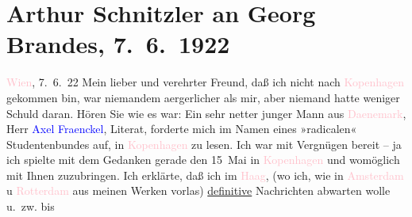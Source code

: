 

               \section[Arthur Schnitzler an Georg Brandes, 7. 6. 1922]{ Arthur Schnitzler an Georg Brandes, 7. 6. 1922}\nopagebreak{}\rehead{ }\normalsize\beginnumbering{} \toendnotes[C]{\smallbreak\pagebreak[2]} 
\toendnotes[C]{\smallbreak}\pstart
           \raggedleft{}{\pb}\textcolor{pink}{Wien}{}\ledrightnote{\textcolor{pink}{Wien}}, 7. 6. 22\pend
           \pstart
           Mein lieber und verehrter Freund, daß ich nicht nach \textcolor{pink}{Kopenhagen}{}\ledrightnote{\textcolor{pink}{Kopenhagen}} gekommen bin, war niemandem
                    aergerlicher als mir, aber niemand hatte weniger Schuld daran. Hören Sie wie es
                    war: Ein sehr netter junger Mann aus \textcolor{pink}{Daenemark}{}\ledrightnote{\textcolor{pink}{Dänemark}}, Herr \textcolor{blue}{Axel Fraenckel}{}\ledrightnote{\textcolor{blue}{Axel Fraenckel}},
                    Literat, forderte mich im Namen eines »radicalen« Studentenbundes auf, in \textcolor{pink}{Kopenhagen}{}\ledrightnote{\textcolor{pink}{Kopenhagen}} zu lesen. Ich war mit Vergnügen
                    bereit – ja ich spielte mit dem Gedanken gerade den 15 Mai in \textcolor{pink}{Kopenhagen}{}\ledrightnote{\textcolor{pink}{Kopenhagen}} und womöglich mit Ihnen
               zuzubringen. Ich erklärte, daß ich im \textcolor{pink}{Haag}{}\ledrightnote{\textcolor{pink}{Den Haag}}, (wo
                    ich, wie in \textcolor{pink}{Amsterdam}{}\ledrightnote{\textcolor{pink}{Amsterdam}} u \textcolor{pink}{Rotterdam}{}\ledrightnote{\textcolor{pink}{Rotterdam}} aus meinen Werken vorlas) \uline{definitive}{ } Nachrichten abwarten wolle u. zw. bis
